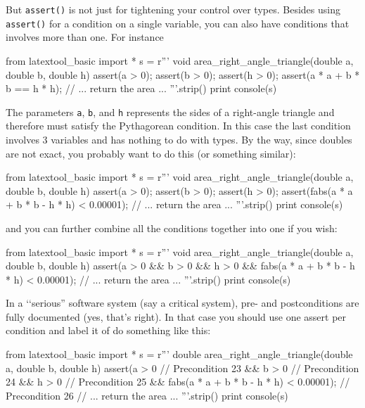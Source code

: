 But \verb!assert()! is not just for tightening your control
over types.
Besides using \verb!assert()! for a condition on a single variable,
you can also have conditions that involves more than one.
For instance 
\begin{python}
from latextool_basic import *
s = r'''
void area_right_angle_triangle(double a, double b, double h)
{
    assert(a > 0);
    assert(b > 0);
    assert(h > 0);
    assert(a * a + b * b == h * h);
    // ... return the area ...
}
'''.strip()
print console(s)
\end{python}
The parameters \verb!a!, \verb!b!, and \verb!h! represents the sides of a
right-angle triangle and therefore must satisfy the Pythagorean condition.
In this case the last condition involves 3 variables and has nothing to do with
types.
By the way, since doubles are not exact, you probably want to do this 
(or something similar):
\begin{python}
from latextool_basic import *
s = r'''
void area_right_angle_triangle(double a, double b, double h)
{
    assert(a > 0);
    assert(b > 0);
    assert(h > 0); 
    assert(fabs(a * a + b * b - h * h) < 0.00001);
    // ... return the area ...
}
'''.strip()
print console(s)
\end{python}
and you can further combine all the conditions together into one if you wish:
\begin{python}
from latextool_basic import *
s = r'''
void area_right_angle_triangle(double a, double b, double h)
{
    assert(a > 0 && b > 0 && h > 0 
           && fabs(a * a + b * b - h * h) < 0.00001);
    // ... return the area ...
}
'''.strip()
print console(s)
\end{python}

In a \lq\lq serious'' software system (say a critical system), 
pre- and postconditions
are fully documented (yes, that's right).
In that case you should use one assert per condition and label it of do something
like this:
\begin{python}
from latextool_basic import *
s = r'''
double area_right_angle_triangle(double a, double b, double h)
{
    assert(a > 0                                      // Precondition 23
           && b > 0                                   // Precondition 24
           && h > 0                                   // Precondition 25
           && fabs(a * a + b * b - h * h) < 0.00001); // Precondition 26
    // ... return the area ...
}
'''.strip()
print console(s)
\end{python}


